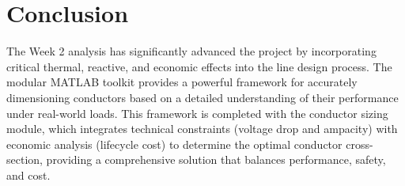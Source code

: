 \documentclass[12pt, a4paper]{article}
\begin{document}
\section{Conclusion}
The Week 2 analysis has significantly advanced the project by incorporating critical thermal, reactive, and economic effects into the line design process. The modular MATLAB toolkit provides a powerful framework for accurately dimensioning conductors based on a detailed understanding of their performance under real-world loads. This framework is completed with the conductor sizing module, which integrates technical constraints (voltage drop and ampacity) with economic analysis (lifecycle cost) to determine the optimal conductor cross-section, providing a comprehensive solution that balances performance, safety, and cost.
\end{document}
